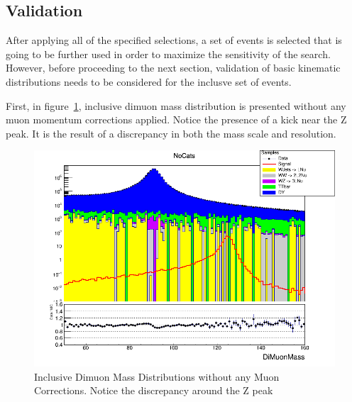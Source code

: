 \subsection{Validation}
After applying all of the specified selections, a set of events is selected that is going to be further used in order to maximize the sensitivity of the search. However, before proceeding to the next section, validation of basic kinematic distributions needs to be considered for the inclusve set of events.

First, in figure~\ref{fig:higgs_selections_inclusivemassnocorr}, inclusive dimuon mass distribution is presented without any muon momentum corrections applied. Notice the presence of a kick near the Z peak. It is the result of a discrepancy in both the mass scale and resolution.
\begin{figure}[htbp]
  \centering
  \includegraphics[width=0.5\linewidth]{figures/ch_higgs/distributions/baseline_nocorrections/distribution__NoCats__DiMuonMass__logY.png}
  \caption{Inclusive Dimuon Mass Distributions without any Muon Corrections. Notice the discrepancy around the Z peak}
  \label{fig:higgs_selections_inclusivemassnocorr}
\end{figure}

